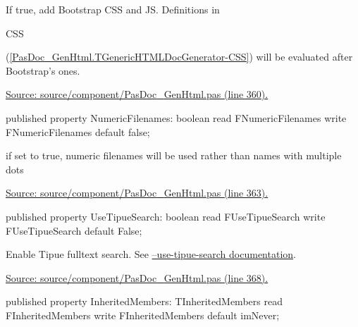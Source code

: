 \documentclass{report}
\newif\ifpdf
\begin{document}
\begin{list}{}
\begin{flushleft}
\ifpdf
\end{flushleft}
\fi


\par If true, add Bootstrap CSS and JS. Definitions in \begin{ttfamily}CSS\end{ttfamily}(\ref{PasDoc_GenHtml.TGenericHTMLDocGenerator-CSS}) will be evaluated after Bootstrap's ones.\par
\href{https://github.com/pasdoc/pasdoc/blob/master/source/component/PasDoc_GenHtml.pas#L360}{Source: source/component/PasDoc{\_}GenHtml.pas (line 360).}\label{PasDoc_GenHtml.TGenericHTMLDocGenerator-NumericFilenames}
\item[\textbf{NumericFilenames}\hfill]
\ifpdf
\begin{flushleft}
\fi
\begin{ttfamily}
published property NumericFilenames: boolean read FNumericFilenames write FNumericFilenames
      default false;\end{ttfamily}

\ifpdf
\end{flushleft}
\fi


\par if set to true, numeric filenames will be used rather than names with multiple dots\par
\href{https://github.com/pasdoc/pasdoc/blob/master/source/component/PasDoc_GenHtml.pas#L363}{Source: source/component/PasDoc{\_}GenHtml.pas (line 363).}\label{PasDoc_GenHtml.TGenericHTMLDocGenerator-UseTipueSearch}
\item[\textbf{UseTipueSearch}\hfill]
\ifpdf
\begin{flushleft}
\fi
\begin{ttfamily}
published property UseTipueSearch: boolean read FUseTipueSearch write FUseTipueSearch
      default False;\end{ttfamily}

\ifpdf
\end{flushleft}
\fi


\par Enable Tipue fulltext search. See \href{https://pasdoc.github.io/UseTipueSearchOption}{--use-tipue-search documentation}.\par
\href{https://github.com/pasdoc/pasdoc/blob/master/source/component/PasDoc_GenHtml.pas#L368}{Source: source/component/PasDoc{\_}GenHtml.pas (line 368).}\label{PasDoc_GenHtml.TGenericHTMLDocGenerator-InheritedMembers}
\item[\textbf{InheritedMembers}\hfill]
\ifpdf
\begin{flushleft}
\fi
\begin{ttfamily}
published property InheritedMembers: TInheritedMembers
      read FInheritedMembers write FInheritedMembers default imNever;\end{ttfamily}


\end{flushleft}
\end{list}
\end{document}

